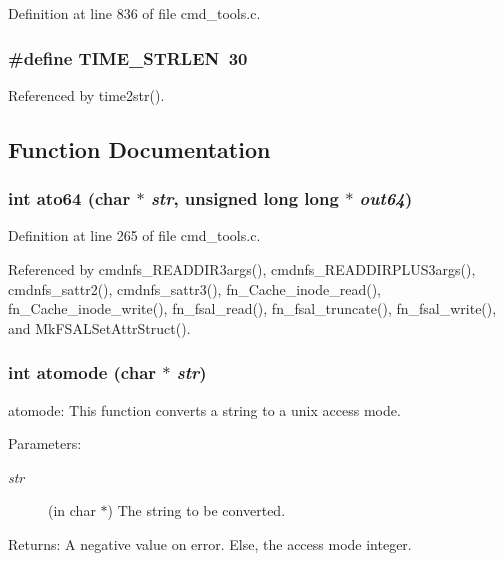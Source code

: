 Definition at line 836 of file cmd\_\-tools.c.
\subsubsection{\setlength{\rightskip}{0pt plus 5cm}\#define TIME\_\-STRLEN\ 30}\label{cmd__tools_8c_a0}




Referenced by time2str().

\subsection{Function Documentation}
\subsubsection{\setlength{\rightskip}{0pt plus 5cm}int ato64 (char $\ast$ {\em str}, unsigned long long $\ast$ {\em out64})}\label{cmd__tools_8c_a8}




Definition at line 265 of file cmd\_\-tools.c.

Referenced by cmdnfs\_\-READDIR3args(), cmdnfs\_\-READDIRPLUS3args(), cmdnfs\_\-sattr2(), cmdnfs\_\-sattr3(), fn\_\-Cache\_\-inode\_\-read(), fn\_\-Cache\_\-inode\_\-write(), fn\_\-fsal\_\-read(), fn\_\-fsal\_\-truncate(), fn\_\-fsal\_\-write(), and Mk\-FSALSet\-Attr\-Struct().
\subsubsection{\setlength{\rightskip}{0pt plus 5cm}int atomode (char $\ast$ {\em str})}\label{cmd__tools_8c_a7}


atomode: This function converts a string to a unix access mode.

\begin{Desc}
\item[Parameters:]
\begin{description}
\item[{\em str}](in char $\ast$) The string to be converted.\end{description}
\end{Desc}
\begin{Desc}
\item[Returns:]A negative value on error. Else, the access mode integer. \end{Desc}


